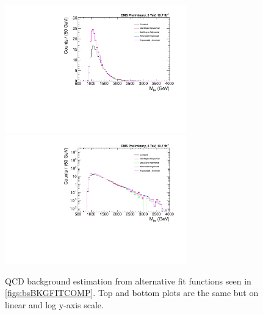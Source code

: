 \begin{figure}[htcb]
\begin{center}
\includegraphics[width=0.7\textwidth]{AN-14-049/figs/BKGCOMP.pdf}\\
\includegraphics[width=0.7\textwidth]{AN-14-049/figs/BKGCOMPLOG.pdf}
\caption{
QCD background estimation from alternative fit functions seen in \ref{figs:bsBKGFITCOMP}. Top and bottom plots are the same but on linear and log y-axis scale.
}
\label{figs:bsBKGCOMP}
\end{center}
\end{figure}


